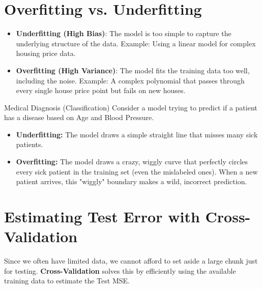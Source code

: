 \documentclass[11pt, a4paper]{article}
\begin{document}
\section{Overfitting vs. Underfitting}
\begin{itemize}
    \item \textbf{Underfitting (High Bias)}: The model is too simple to capture the underlying structure of the data. Example: Using a linear model for complex housing price data.
    \item \textbf{Overfitting (High Variance)}: The model fits the training data too well, including the noise. Example: A complex polynomial that passes through every single house price point but fails on new houses.
\end{itemize}

\begin{examplebox}{Medical Diagnosis (Classification)}
Consider a model trying to predict if a patient has a disease based on Age and Blood Pressure.
\begin{itemize}
    \item \textbf{Underfitting:} The model draws a simple straight line that misses many sick patients.
    \item \textbf{Overfitting:} The model draws a crazy, wiggly curve that perfectly circles every sick patient in the training set (even the mislabeled ones). When a new patient arrives, this "wiggly" boundary makes a wild, incorrect prediction.
\end{itemize}
\end{examplebox}

\section{Estimating Test Error with Cross-Validation}

Since we often have limited data, we cannot afford to set aside a large chunk just for testing. \textbf{Cross-Validation} solves this by efficiently using the available training data to estimate the Test MSE.
\end{document}
